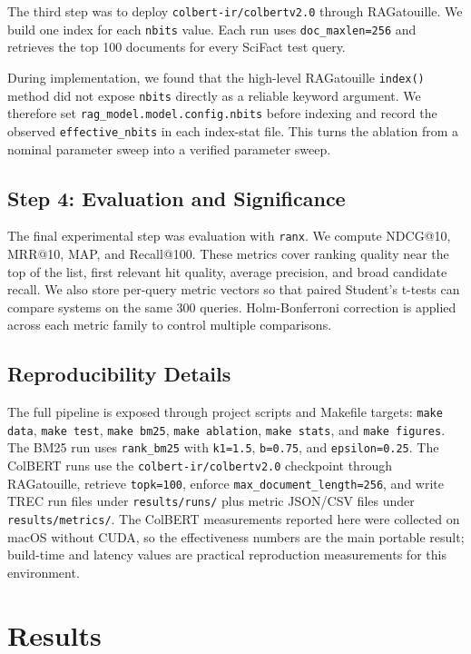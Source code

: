 \documentclass[sigconf,nonacm]{acmart}
\begin{document}
The third step was to deploy \texttt{colbert-ir/colbertv2.0} through
RAGatouille. We build one index for each \texttt{nbits} value. Each run uses
\texttt{doc\_maxlen=256} and retrieves the top 100 documents for every SciFact
test query.

During implementation, we found that the high-level RAGatouille
\texttt{index()} method did not expose \texttt{nbits} directly as a reliable
keyword argument. We therefore set \texttt{rag\_model.model.config.nbits}
before indexing and record the observed \texttt{effective\_nbits} in each
index-stat file. This turns the ablation from a nominal parameter sweep into a
verified parameter sweep.

\subsection{Step 4: Evaluation and Significance}

The final experimental step was evaluation with \texttt{ranx}. We compute
NDCG@10, MRR@10, MAP, and Recall@100. These metrics cover ranking quality near
the top of the list, first relevant hit quality, average precision, and broad
candidate recall. We also store per-query metric vectors so that paired
Student's t-tests can compare systems on the same 300 queries. Holm-Bonferroni
correction is applied across each metric family to control multiple
comparisons.

\subsection{Reproducibility Details}

The full pipeline is exposed through project scripts and Makefile targets:
\texttt{make data}, \texttt{make test}, \texttt{make bm25},
\texttt{make ablation}, \texttt{make stats}, and \texttt{make figures}. The
BM25 run uses \texttt{rank\_bm25} with \texttt{k1=1.5}, \texttt{b=0.75}, and
\texttt{epsilon=0.25}. The ColBERT runs use the
\texttt{colbert-ir/colbertv2.0} checkpoint through RAGatouille, retrieve
\texttt{topk=100}, enforce \texttt{max\_document\_length=256}, and write TREC
run files under \texttt{results/runs/} plus metric JSON/CSV files under
\texttt{results/metrics/}. The ColBERT measurements reported here were
collected on macOS without CUDA, so the effectiveness numbers are the main
portable result; build-time and latency values are practical reproduction
measurements for this environment.

\section{Results}
\end{document}
